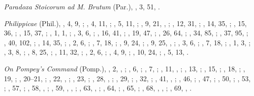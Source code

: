 \begin{autindex}
  \subitem \emph{Paradoxa Stoicorum ad M. Brutum} (Par.),
    , 3, 51, .

  \subitem \emph{Philippicae} (Phil.),
    ,  4,   9, ;
    ,  4,  11, ;
    ,  5,  11, ;
    ,  9,  21, , ;
    , 12,  31, ;
    , 14,  35, ;
    , 15,  36, ;
    , 15,  37, ;
    ,  1,   1, ;
    ,  3,   6, ;
    , 16,  41, ;
    , 19,  47, ;
    , 26,  64, ;
    , 34,  85, ;
    , 37,  95, ;
    , 40, 102, ;
    , 14,  35, ;
    ,  2,   6, ;
    ,  7,  18, ;
    ,  9,  24, ;
    ,  9,  25, , ;
    ,  3,   6, ;
    ,  7,  18, ;
    ,  1,   3, ;
    ,  3,   8, ;
    ,  8,  25, ;
    , 11,  32, ;
    ,  2,   6, ;
    ,  4,   9, ;
    , 10,  24, ;
    ,  5,  13, .

  \subitem \emph{On Pompey's Command} (Pomp.), %
    ,  2, , ;
    ,  6, ;
    ,  7, ;
    , 11, , ;
    , 13, ;
    , 15, ;
    , 18, ;
    , 19, ;
    , 20–21, ;
    , 22, , ;
    , 23, ;
    , 28, , ;
    , 29, ;
    , 32, ;
    , 41, , ;
    , 46, ;
    , 47, ;
    , 50, ;
    , 53, ;
    , 57, ;
    , 58, , ;
    , 59, , , ;
    , 63, , ;
    , 64, ;
    , 65, ;
    , 68, , , ;
    , 69, , .


\end{autindex}
